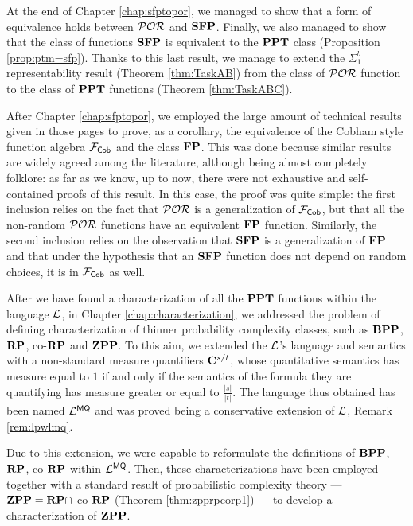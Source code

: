 At the end of Chapter \ref{chap:sfptopor},
we managed to show that a form of equivalence holds
between $\mathcal{POR}$ and $\mathbf{SFP}$. Finally, we also managed to show that
the class of functions $\mathbf{SFP}$ is equivalent to the $\mathbf{PPT}$ class (Proposition \ref{prop:ptm=sfp}).
Thanks to this last result, we manage to extend the $\Sigma^b_1$ representability
result (Theorem \ref{thm:TaskAB}) from the class of $\mathcal{POR}$ function to the
class of $\mathbf{PPT}$ functions (Theorem \ref{thm:TaskABC}).

After Chapter \ref{chap:sfptopor}, we employed the
large amount of technical results given in those pages to
prove, as a corollary, the equivalence of the
Cobham style function algebra $\mathcal{F}_{\mathsf{Cob}}$ and the class $\mathbf{FP}$.
This was done because similar results are widely agreed among the literature,
although being almost completely folklore: as far as we know,
up to now, there were not exhaustive and self-contained
proofs of this result.
%
In this case, the proof was quite simple: the first inclusion
relies on the fact that
$\mathcal{POR}$ is a generalization of $\mathcal{F}_{\mathsf{Cob}}$, but that
all the non-random $\mathcal{POR}$ functions have an equivalent $\mathbf{FP}$ function.
Similarly, the second inclusion relies on the observation that
$\mathbf{SFP}$ is a generalization of $\mathbf{FP}$ and that under the hypothesis
that an $\mathbf{SFP}$ function does not depend on random choices, it
is in $\mathcal{F}_{\mathsf{Cob}}$ as well.


After we have found a characterization of all the $\mathbf{PPT}$
functions within the language $\mathcal{L}$,
in Chapter \ref{chap:characterization}, we addressed
the problem of defining characterization of thinner
probability complexity classes, such as $\mathbf{BPP}$, $\mathbf{RP}$,
co-$\mathbf{RP}$ and $\mathbf{ZPP}$.
To this aim, we extended the $\mathcal{L}$'s language and semantics with
a non-standard measure quantifiers $\mathbf{C}^{s/t}$,
whose quantitative semantics has measure equal to $1$ if and only if the
semantics of the formula they are quantifying
has measure greater or equal to $\frac{|s|}{|t|}$.
The language thus obtained has been named $\mathcal{L}^{\mathsf{MQ}}$ and
was proved being a conservative extension of $\mathcal{L}$, Remark \ref{rem:lpwlmq}.

Due to this extension, we were capable to reformulate the definitions of $\mathbf{BPP}$,
$\mathbf{RP}$, co-$\mathbf{RP}$ within $\mathcal{L}^{\mathsf{MQ}}$. Then, these characterizations have
been employed together with a standard result of probabilistic complexity theory ---
$\mathbf{ZPP} = \mathbf{RP} \cap$ co-$\mathbf{RP}$ (Theorem \ref{thm:zpprpcorp1})  --- to develop a characterization of  $\mathbf{ZPP}$.

